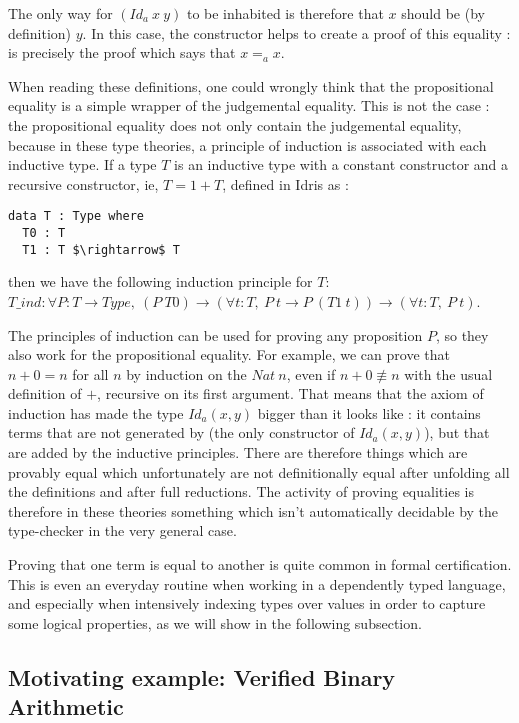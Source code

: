 The only way for $(Id_a\ x\ y)$ to be inhabited is therefore that $x$ should be
(by definition) $y$. In this case, the constructor  helps to create a
proof of this equality :  is precisely the proof which says that
$x=_ax$. 

When reading these definitions, one could wrongly think that the propositional equality is a simple wrapper of the judgemental equality. This is not the case : the propositional equality does not only contain the judgemental equality, because in these type theories, a principle of induction is associated with each inductive type. If a type $T$ is an inductive type with a constant constructor and a recursive constructor, ie, $T = 1 + T$, defined in Idris as : 

\begin{lstlisting}
data T : Type where
  T0 : T
  T1 : T $\rightarrow$ T          
\end{lstlisting}

then we have the following induction principle for $T$: \\
$T\_ind : \forall P:T \rightarrow Type,\ (P\ T0) \rightarrow (\forall t:T,\ P\ t \rightarrow P\ (T1\ t)) \rightarrow (\forall t:T,\ P\ t)$.

The principles of induction can be used for proving any proposition $P$, so they also work for the propositional equality. For example, we can prove that $n+0 = n$ for all $n$ by induction on the $Nat\ n$, even if $n+0 \not\equiv n$ with the usual definition of $+$, recursive on its first argument. That means that the axiom of induction has made the type $Id_{a}(x,y)$ bigger than it looks like : it contains terms that are not generated by  (the only constructor of $Id_{a}(x,y)$), but that are added by the inductive principles. There are therefore things which are provably equal which unfortunately are not definitionally equal after unfolding all the definitions and after full reductions. The activity of proving equalities is therefore in these theories something which isn't automatically decidable by the type-checker in the very general case.

Proving that one term is equal to another is quite common
in formal certification. This is even an everyday routine when working in a dependently typed language, and especially when intensively indexing types over values in order to capture some logical properties, as we will show in the following subsection.

\subsection{Motivating example: Verified Binary Arithmetic}
\label{sect:motivatingExample}

